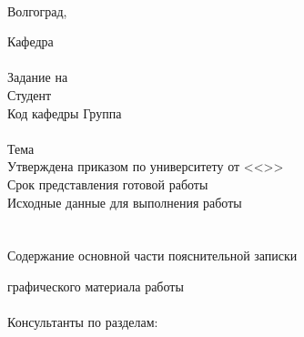 {{\hfill
{}\\
\vspace{\fill}
\begin{center}
Волгоград,~\the\year
\end{center}
\newpage
{
\clearpage
\thispagestyle{empty}
\begin{center}
\VSTUTitleHeading
\end{center}
Кафедра~\uline{\VSTUDepartment\hfill}\\
\vfill
\hfill\VSTUTitleHeadApproval
\vspace{\fill}
\\Задание на \\
Студент \\
Код кафедры \uline{\makebox[4cm]{\VSTUDepartmentCode}} \hfill Группа \uline{\makebox[4cm]{\VSTUStudentGroup}}\\
\vspace{1mm}\\
Тема \VSTUTitleUL\\
Утверждена приказом по университету от <<\uline{\makebox[0.5cm]{\VSTUOrderDate}}>> \uline{\makebox[1.8cm]{\VSTUOrderMonth}} \uline{\makebox[1.2cm]{\VSTUOrderYear}} \No\uline{\makebox[1.5cm]{\VSTUOrderNumber}}\\
Срок представления готовой работы \\
Исходные данные для выполнения работы\\
\VSTUInitialDataUL\\
\vspace{4mm}\\
Содержание основной части пояснительной записки
{\small
\VSTUPZContents
}
\thispagestyle{empty}
\addtocounter{page}{-1}
 графического материала
{\small
\VSTUPZGraphics
}
\vspace{\fill}
\thispagestyle{empty}
 работы 
\hfill
{}\\\\
Консультанты по разделам:\\
\hfill
{}
}}}
